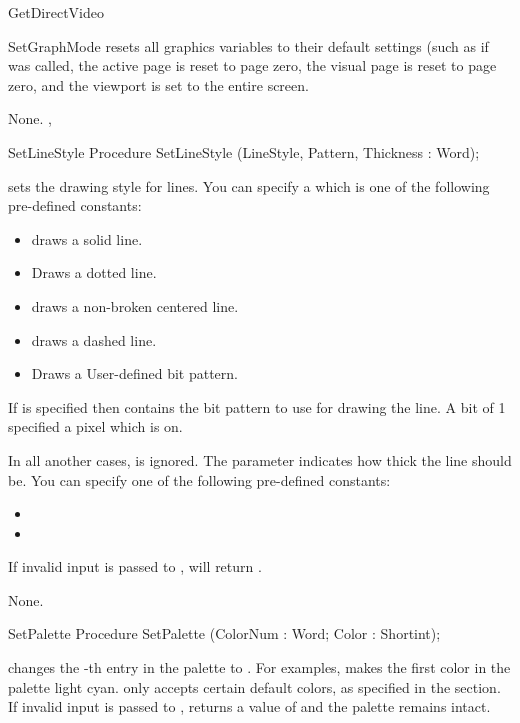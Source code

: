 \begin{function}{GetDirectVideo}
\begin{procedure}{SetGraphMode}
 resets all graphics variables to their default
settings (such as if  was called, the active page
is reset to page zero, the visual page is reset to page zero, and the viewport
is set to the entire screen.

\Errors
None.
\SeeAlso
{}, 
\end{procedure}
\begin{procedure}{SetLineStyle}
\Declaration
Procedure SetLineStyle (LineStyle, Pattern, Thickness : Word);

\Description
{}
sets the drawing style for lines. You can specify a  which is
one of the following pre-defined constants:
\begin{itemize}
\item {} draws a solid line.
\item {} Draws a dotted line.
\item {} draws a non-broken centered line.
\item {} draws a dashed line.
\item {} Draws a User-defined bit pattern.
\end{itemize}
If  is specified then  contains the bit pattern to
use for drawing the line. A bit of 1 specified a pixel which is on.

In all another cases,  is ignored. The parameter 
indicates how thick the line should be. You can specify one of the following
pre-defined constants:
\begin{itemize}
\item {}
\item {}
\end{itemize}

If invalid input is passed to  ,  will
return .

\Errors
None.
\SeeAlso
{}
\end{procedure}
\begin{procedure}{SetPalette}
\Declaration
Procedure SetPalette (ColorNum : Word; Color : Shortint);

\Description
{} changes the -th entry in the palette to
. For examples,  makes the first
color in the palette light cyan.  only accepts certain default
colors, as specified in the  section. If invalid
input is passed to ,  returns a value
of  and the palette remains intact.


\end{procedure}
\end{function}
